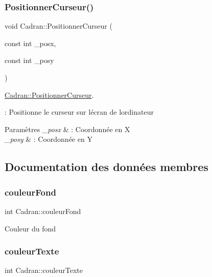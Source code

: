 \subsubsection{\texorpdfstring{Positionner\+Curseur()}{PositionnerCurseur()}}
{\footnotesize\ttfamily void Cadran\+::\+Positionner\+Curseur (\begin{DoxyParamCaption}\item[{const int}]{\+\_\+posx,  }\item[{const int}]{\+\_\+posy }\end{DoxyParamCaption})\hspace{0.3cm}{\ttfamily [private]}}



\hyperlink{class_cadran_aad5b68b6c93bfba09b0903eb7faacc9b}{Cadran\+::\+Positionner\+Curseur}. 

\+: Positionne le curseur sur l\textquotesingle{}écran de l\textquotesingle{}ordinateur 
\begin{DoxyParams}{Paramètres}
{\em \+\_\+posx} & \+: Coordonnée en X \\
\hline
{\em \+\_\+posy} & \+: Coordonnée en Y \\
\hline
\end{DoxyParams}


\subsection{Documentation des données membres}
\mbox{\label{class_cadran_a2d7643e20b61690fc575421543757c7c}} 
\subsubsection{\texorpdfstring{couleur\+Fond}{couleurFond}}
{\footnotesize\ttfamily int Cadran\+::couleur\+Fond\hspace{0.3cm}{\ttfamily [private]}}

Couleur du fond \mbox{\label{class_cadran_a2070501e183ca1fb9c495a6ba878a97e}} 
\subsubsection{\texorpdfstring{couleur\+Texte}{couleurTexte}}
{\footnotesize\ttfamily int Cadran\+::couleur\+Texte\hspace{0.3cm}{\ttfamily [private]}}




